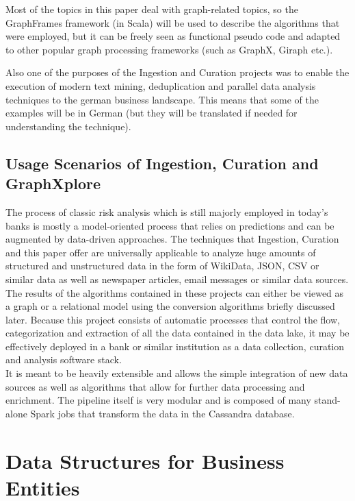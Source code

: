 \documentclass[
        a4paper,     %
        titlepage,   %
        oneside,     %
        parskip      %
]{scrartcl}          %
\begin{document}
    Most of the topics in this paper deal with graph-related topics, so the GraphFrames framework
    (in Scala) will be used to describe the algorithms that were employed,
    but it can be freely seen as functional pseudo code and adapted to other popular
    graph processing frameworks (such as GraphX, Giraph etc.).

    Also one of the purposes of the Ingestion and Curation projects was to enable
    the execution of modern text mining, deduplication and parallel data analysis techniques
    to the german business landscape. This means that some of the examples will be
    in German (but they will be translated if needed for understanding the technique).

    \subsection{Usage Scenarios of Ingestion, Curation and GraphXplore}
    The process of classic risk analysis which is still majorly employed in today's banks is mostly
    a model-oriented process that relies on predictions and can be augmented by data-driven approaches.
    The techniques that Ingestion, Curation and this paper offer are universally
    applicable to analyze huge amounts of structured and unstructured data
    in the form of WikiData, JSON, CSV or similar data as well as newspaper articles,
    email messages or similar data sources.\\
    The results of the algorithms contained in these projects can either be viewed as a graph or a relational model
    using the conversion algorithms briefly discussed later.
    Because this project consists of automatic processes
    that control the flow, categorization and extraction
    of all the data contained in the data lake, it may be effectively deployed in a bank
    or similar institution as a data collection, curation and analysis software stack.\\
    It is meant to be heavily extensible and allows the simple integration of new data sources %
    as well as algorithms that allow for further data processing and enrichment.
    The pipeline itself is very modular and is composed of many stand-alone
    Spark jobs that transform the data in the Cassandra database.

  \section{Data Structures for Business Entities}
\end{document}
